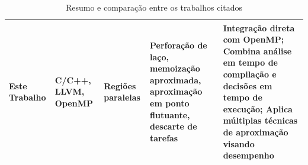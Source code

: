 \begin{table}[htb]
\begin{tabular}{|p{2.3cm}|p{3cm}|p{2cm}|p{3cm}|p{4cm}|}
        \hline
        \textbf{Este Trabalho}                    & \textbf{C/C++, LLVM, OpenMP}        & \textbf{Regiões paralelas}     & \textbf{Perforação de laço, memoização aproximada, aproximação em ponto flutuante, descarte de tarefas} & \textbf{Integração direta com OpenMP; Combina análise em tempo de compilação e decisões em tempo de execução; Aplica múltiplas técnicas de aproximação visando desempenho} \\
        \hline
    \end{tabular}
    \caption{Resumo e comparação entre os trabalhos citados}
    \fonte{}
    \label{tab:trabComp}
\end{table}
